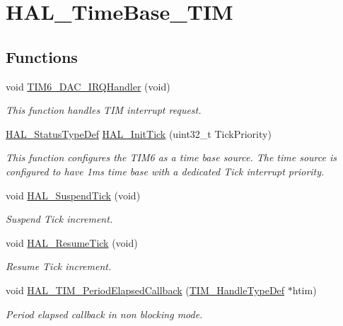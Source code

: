 \hypertarget{group___h_a_l___time_base___t_i_m}{}\section{H\+A\+L\+\_\+\+Time\+Base\+\_\+\+T\+IM}
\label{group___h_a_l___time_base___t_i_m}
\subsection*{Functions}
\begin{DoxyCompactItemize}
\item 
void \hyperlink{group___h_a_l___time_base___t_i_m_ga0839a45f331c4c067939b9c4533bbf4d}{T\+I\+M6\+\_\+\+D\+A\+C\+\_\+\+I\+R\+Q\+Handler} (void)
\begin{DoxyCompactList}\small\item\em This function handles T\+IM interrupt request. \end{DoxyCompactList}\item 
\hyperlink{stm32f0xx__hal__def_8h_a63c0679d1cb8b8c684fbb0632743478f}{H\+A\+L\+\_\+\+Status\+Type\+Def} \hyperlink{group___h_a_l___time_base___t_i_m_ga879cdb21ef051eb81ec51c18147397d5}{H\+A\+L\+\_\+\+Init\+Tick} (uint32\+\_\+t Tick\+Priority)
\begin{DoxyCompactList}\small\item\em This function configures the T\+I\+M6 as a time base source. The time source is configured to have 1ms time base with a dedicated Tick interrupt priority. \end{DoxyCompactList}\item 
void \hyperlink{group___h_a_l___time_base___t_i_m_gaaf651af2afe688a991c657f64f8fa5f9}{H\+A\+L\+\_\+\+Suspend\+Tick} (void)
\begin{DoxyCompactList}\small\item\em Suspend Tick increment. \end{DoxyCompactList}\item 
void \hyperlink{group___h_a_l___time_base___t_i_m_ga24e0ee9dae1ec0f9d19200f5575ff790}{H\+A\+L\+\_\+\+Resume\+Tick} (void)
\begin{DoxyCompactList}\small\item\em Resume Tick increment. \end{DoxyCompactList}\item 
void \hyperlink{group___h_a_l___time_base___t_i_m_ga8a3b0ad512a6e6c6157440b68d395eac}{H\+A\+L\+\_\+\+T\+I\+M\+\_\+\+Period\+Elapsed\+Callback} (\hyperlink{struct_t_i_m___handle_type_def}{T\+I\+M\+\_\+\+Handle\+Type\+Def} $\ast$htim)
\begin{DoxyCompactList}\small\item\em Period elapsed callback in non blocking mode. \end{DoxyCompactList}\end{DoxyCompactItemize}
